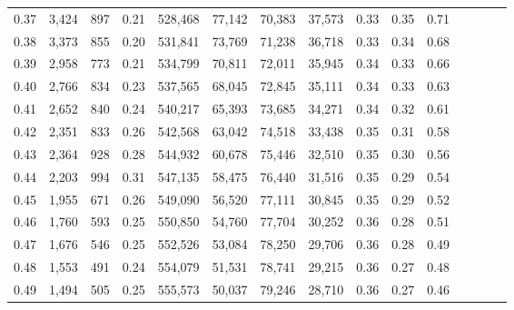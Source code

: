 \begin{tabular}{rrrcrrrrrrrrrrr}
0.37 &   3,424 &    897 &                                       0.21 &  528,468 &   77,142 &   70,383 &   37,573 &  0.33 &  0.35 &                         0.71 \\
0.38 &   3,373 &    855 &                                       0.20 &  531,841 &   73,769 &   71,238 &   36,718 &  0.33 &  0.34 &                         0.68 \\
0.39 &   2,958 &    773 &                                       0.21 &  534,799 &   70,811 &   72,011 &   35,945 &  0.34 &  0.33 &                         0.66 \\
0.40 &   2,766 &    834 &                                       0.23 &  537,565 &   68,045 &   72,845 &   35,111 &  0.34 &  0.33 &                         0.63 \\
0.41 &   2,652 &    840 &                                       0.24 &  540,217 &   65,393 &   73,685 &   34,271 &  0.34 &  0.32 &                         0.61 \\
0.42 &   2,351 &    833 &                                       0.26 &  542,568 &   63,042 &   74,518 &   33,438 &  0.35 &  0.31 &                         0.58 \\
0.43 &   2,364 &    928 &                                       0.28 &  544,932 &   60,678 &   75,446 &   32,510 &  0.35 &  0.30 &                         0.56 \\
0.44 &   2,203 &    994 &                                       0.31 &  547,135 &   58,475 &   76,440 &   31,516 &  0.35 &  0.29 &                         0.54 \\
0.45 &   1,955 &    671 &                                       0.26 &  549,090 &   56,520 &   77,111 &   30,845 &  0.35 &  0.29 &                         0.52 \\
0.46 &   1,760 &    593 &                                       0.25 &  550,850 &   54,760 &   77,704 &   30,252 &  0.36 &  0.28 &                         0.51 \\
0.47 &   1,676 &    546 &                                       0.25 &  552,526 &   53,084 &   78,250 &   29,706 &  0.36 &  0.28 &                         0.49 \\
0.48 &   1,553 &    491 &                                       0.24 &  554,079 &   51,531 &   78,741 &   29,215 &  0.36 &  0.27 &                         0.48 \\
0.49 &   1,494 &    505 &                                       0.25 &  555,573 &   50,037 &   79,246 &   28,710 &  0.36 &  0.27 &                         0.46 \\

\end{tabular}
